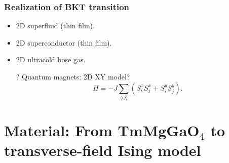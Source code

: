 \documentclass[xcolor=table, aspectratio=1610,ignorenonframetext]{beamer}
\begin{document}
\begin{frame}
  \frametitle{Realization of BKT transition}
  \begin{itemize}
  \item 2D superfluid (thin film).
  \item 2D superconductor (thin film).
  \item 2D ultracold bose gas.
  \item[?] Quantum magnets: 2D XY model?
    \[H=-J\sum_{\langle ij\rangle}\left(S_i^xS_j^x + S_i^yS_j^y\right).\]
  \end{itemize}
\end{frame}

\section{Material: From TmMgGaO${}_4$ to transverse-field Ising model}
\end{document}
